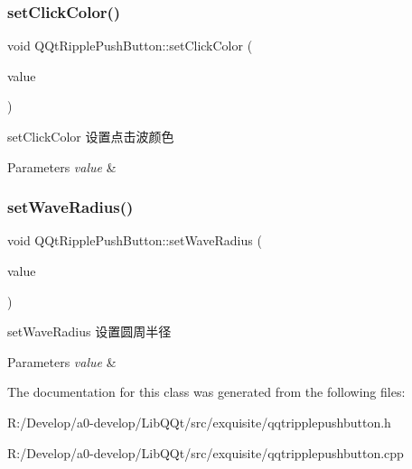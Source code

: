 \subsubsection{\texorpdfstring{set\+Click\+Color()}{setClickColor()}}
{\footnotesize\ttfamily void Q\+Qt\+Ripple\+Push\+Button\+::set\+Click\+Color (\begin{DoxyParamCaption}\item[{const Q\+Color \&}]{value }\end{DoxyParamCaption})}



set\+Click\+Color 设置点击波颜色 


\begin{DoxyParams}{Parameters}
{\em value} & \\
\hline
\end{DoxyParams}
\mbox{\label{class_q_qt_ripple_push_button_a5b31e33ace99d41f1cd8f291c80c0a09}} 
\subsubsection{\texorpdfstring{set\+Wave\+Radius()}{setWaveRadius()}}
{\footnotesize\ttfamily void Q\+Qt\+Ripple\+Push\+Button\+::set\+Wave\+Radius (\begin{DoxyParamCaption}\item[{const qreal \&}]{value }\end{DoxyParamCaption})}



set\+Wave\+Radius 设置圆周半径 


\begin{DoxyParams}{Parameters}
{\em value} & \\
\hline
\end{DoxyParams}


The documentation for this class was generated from the following files\+:\begin{DoxyCompactItemize}
\item 
R\+:/\+Develop/a0-\/develop/\+Lib\+Q\+Qt/src/exquisite/qqtripplepushbutton.\+h\item 
R\+:/\+Develop/a0-\/develop/\+Lib\+Q\+Qt/src/exquisite/qqtripplepushbutton.\+cpp\end{DoxyCompactItemize}
